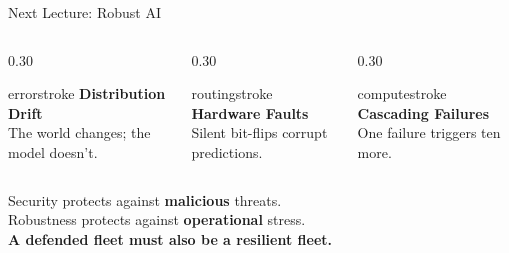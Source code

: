 \documentclass[aspectratio=169, 12pt]{beamer}
\begin{document}
\begin{frame}{Next Lecture: Robust AI}

\footnotesize
\begin{columns}[c]
  \begin{column}{0.30\textwidth}
    \centering
    \begin{mlsyscard}{errorstroke}
    {\large\bfseries Distribution Drift}\\[0.15cm]
    {\footnotesize The world changes; the model doesn't.}
    \end{mlsyscard}
  \end{column}
  \begin{column}{0.30\textwidth}
    \centering
    \begin{mlsyscard}{routingstroke}
    {\large\bfseries Hardware Faults}\\[0.15cm]
    {\footnotesize Silent bit-flips corrupt predictions.}
    \end{mlsyscard}
  \end{column}
  \begin{column}{0.30\textwidth}
    \centering
    \begin{mlsyscard}{computestroke}
    {\large\bfseries Cascading Failures}\\[0.15cm]
    {\footnotesize One failure triggers ten more.}
    \end{mlsyscard}
  \end{column}
\end{columns}

\vspace{0.3cm}
\centering
{\normalsize Security protects against \textbf{malicious} threats.\\
Robustness protects against \textbf{operational} stress.}\\[0.1cm]
{\small\textbf{A defended fleet must also be a resilient fleet.}}

\end{frame}
\end{document}
